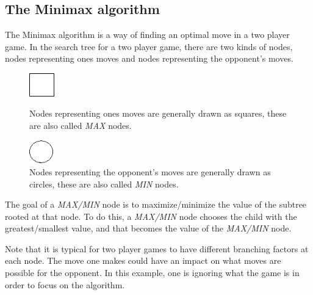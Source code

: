 \label{second part}
\subsection{The Minimax algorithm}
The Minimax algorithm is a way of finding an optimal move in a two player game. In the search tree for a two player game, there are two kinds of nodes, nodes representing ones moves and nodes representing the opponent's moves.\cite{graphics_minimax}
\begin{figure}[H]
\centering
	\begin{minipage}[b]{0.45\linewidth}
		\centering
		\includegraphics[height=1cm]{2_State_of_the_art/Arimaa_on_MCTS_Benoit/img/max.png}
		\caption{\label{fig:max}Nodes representing ones moves are generally drawn as squares, these are also called \emph{MAX} nodes.}
	\end{minipage}%
	\hspace*{1cm}
	\begin{minipage}[b]{0.45\linewidth}
		\centering
		\includegraphics[height=1cm]{2_State_of_the_art/Arimaa_on_MCTS_Benoit/img/min.png}
		\caption{\label{fig:min}Nodes representing the opponent's moves are generally drawn as circles, these are also called \emph{MIN} nodes.}
	\end{minipage}%
\end{figure}

The goal of a \emph{MAX/MIN} node is to maximize/minimize the value of the subtree rooted at that node. To do this, a \emph{MAX/MIN} node chooses the child with the greatest/smallest value, and that becomes the value of the \emph{MAX/MIN} node.

Note that it is typical for two player games to have different branching factors at each node. The move one makes could have an impact on what moves are possible for the opponent. In this example, one is ignoring what the game is in order to focus on the algorithm.

